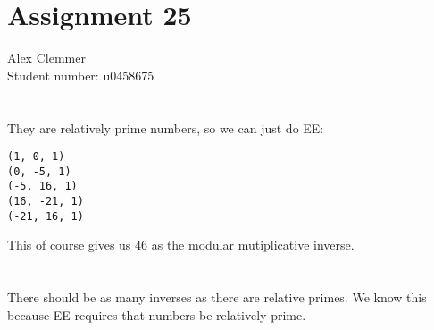 \documentclass[a4paper]{article}
\begin{document}
\section*{Assignment 25}
Alex Clemmer\\
Student number: u0458675

\section{}

They are relatively prime numbers, so we can just do EE:

\begin{verbatim}
(1, 0, 1)
(0, -5, 1)
(-5, 16, 1)
(16, -21, 1)
(-21, 16, 1)
\end{verbatim}

This of course gives us 46 as the modular mutiplicative inverse.

\section{}

There should be as many inverses as there are relative primes. We know this because EE requires that numbers be relatively prime.
\end{document}
